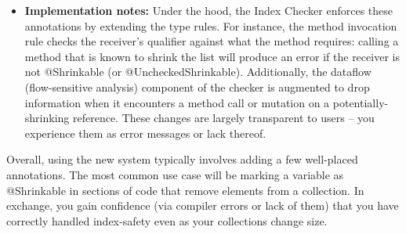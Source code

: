 \begin{itemize}
\item
  \textbf{Implementation notes:}
    Under the hood, the Index Checker enforces these annotations by extending the type rules.
    For instance, the method invocation rule checks the receiver’s qualifier against what the
    method requires: calling a method that is known to shrink the list will produce an error if
    the receiver is not @Shrinkable (or @UncheckedShrinkable). Additionally, the dataflow
    (flow-sensitive analysis) component of the checker is augmented to drop information when it
    encounters a method call or mutation on a potentially-shrinking reference. These changes are
    largely transparent to users – you experience them as error messages or lack thereof.
\end{itemize}
Overall, using the new system typically involves adding a few well-placed annotations. The
most common use case will be marking a variable as @Shrinkable in sections of code that
remove elements from a collection. In exchange, you gain confidence (via compiler errors or
lack of them) that you have correctly handled index-safety even as your collections change size.


